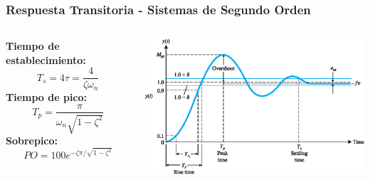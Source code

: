 \documentclass[aspectratio=169,handout]{beamer}
\theoremstyle{definition}
\theoremstyle{plain}
\theoremstyle{remark}
\begin{document}
\begin{frame}[<-+>]\frametitle{Respuesta Transitoria - Sistemas de Segundo Orden}
\vspace*{3mm}
\begin{columns}
 \begin{column}{0.3\textwidth}
 \textbf{Tiempo de establecimiento:}
 \begin{equation*}
  T_s = 4 \tau = \frac{4}{\zeta \omega_n}
 \end{equation*}
 \textbf{Tiempo de pico:}
 \begin{equation*}
   T_p = \frac{\pi}{\omega_n \sqrt{1-\zeta^2}}
 \end{equation*}
 \textbf{Sobrepico:}
 \begin{equation*}
   PO = 100 e^{-\zeta \pi/\sqrt{1-\zeta^2}}
 \end{equation*}
 \end{column} 
 \begin{column}{0.7\textwidth}
  \centering
  \includegraphics[width=9cm]{images/secondOrderResponseParameters.eps}
 \end{column} 
\end{columns}
\end{frame}
\end{document}
